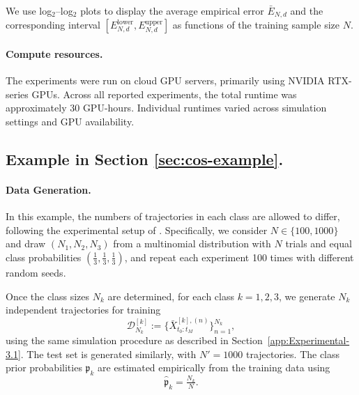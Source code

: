 \documentclass{article}
\theoremstyle{plain}
\theoremstyle{definition}
\theoremstyle{remark}
\begin{document}
We use log$_2$--log$_2$ plots to display the average empirical error $\bar{E}_{N,d}$ and the corresponding interval $[E_{N,d}^{\text{lower}}, E_{N,d}^{\text{upper}}]$ as functions of the training sample size $N$.

\paragraph{Compute resources.}
The experiments were run on cloud GPU servers, primarily using NVIDIA RTX-series GPUs. Across all reported experiments, the total runtime was approximately 30 GPU-hours. Individual runtimes varied across simulation settings and GPU availability.


\subsection{Example in Section \ref{sec:cos-example}.}\label{app:Experimental-3.2}





\paragraph{Data Generation.}

In this example, the numbers of trajectories in each class are allowed to differ, following the experimental setup of \citet{Denis2024}. Specifically, we consider $N \in \{100,1000\}$ and draw $(N_1, N_2, N_3)$ from a multinomial distribution with $N$ trials and equal class probabilities $(\tfrac{1}{3}, \tfrac{1}{3}, \tfrac{1}{3})$, and repeat each experiment 100 times with different random seeds. 

Once the class sizes $N_k$ are determined, for each class $k = 1,2,3$, we generate $N_k$ independent trajectories for training
\[
\mathcal{D}^{[k]}_{N_k}
:=
\bigl\{
\bar{X}^{[k],(n)}_{t_0:t_M}
\bigr\}_{n=1}^{N_k},
\]
using the same simulation procedure as described in Section~\ref{app:Experimental-3.1}. The test set is generated similarly, with $N'=1000$ trajectories. The class prior probabilities $\mathfrak{p}_k$ are estimated empirically from the training data using
\[
\widehat{\mathfrak{p}}_k = \tfrac{N_k}{N}. 
\]
\end{document}
